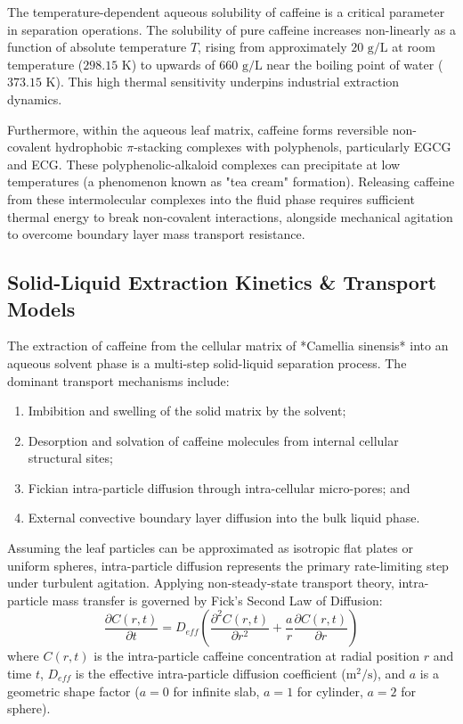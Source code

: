 \documentclass{article}
\begin{document}
The temperature-dependent aqueous solubility of caffeine is a critical parameter in separation operations. The solubility of pure caffeine increases non-linearly as a function of absolute temperature $T$, rising from approximately $20\text{ g/L}$ at room temperature ($298.15\text{ K}$) to upwards of $660\text{ g/L}$ near the boiling point of water ($373.15\text{ K}$). This high thermal sensitivity underpins industrial extraction dynamics.

Furthermore, within the aqueous leaf matrix, caffeine forms reversible non-covalent hydrophobic $\pi$-stacking complexes with polyphenols, particularly EGCG and ECG. These polyphenolic-alkaloid complexes can precipitate at low temperatures (a phenomenon known as "tea cream" formation). Releasing caffeine from these intermolecular complexes into the fluid phase requires sufficient thermal energy to break non-covalent interactions, alongside mechanical agitation to overcome boundary layer mass transport resistance.

\subsection{Solid-Liquid Extraction Kinetics \& Transport Models}

The extraction of caffeine from the cellular matrix of *Camellia sinensis* into an aqueous solvent phase is a multi-step solid-liquid separation process. The dominant transport mechanisms include:
\begin{enumerate}
    \item Imbibition and swelling of the solid matrix by the solvent;
    \item Desorption and solvation of caffeine molecules from internal cellular structural sites;
    \item Fickian intra-particle diffusion through intra-cellular micro-pores; and
    \item External convective boundary layer diffusion into the bulk liquid phase.
\end{enumerate}

Assuming the leaf particles can be approximated as isotropic flat plates or uniform spheres, intra-particle diffusion represents the primary rate-limiting step under turbulent agitation. Applying non-steady-state transport theory, intra-particle mass transfer is governed by Fick's Second Law of Diffusion:
\begin{equation}
\frac{\partial C(r,t)}{\partial t} = D_{eff} \left( \frac{\partial^2 C(r,t)}{\partial r^2} + \frac{a}{r} \frac{\partial C(r,t)}{\partial r} \right)
\end{equation}
where $C(r,t)$ is the intra-particle caffeine concentration at radial position $r$ and time $t$, $D_{eff}$ is the effective intra-particle diffusion coefficient ($\text{m}^2/\text{s}$), and $a$ is a geometric shape factor ($a = 0$ for infinite slab, $a = 1$ for cylinder, $a = 2$ for sphere).
\end{document}
